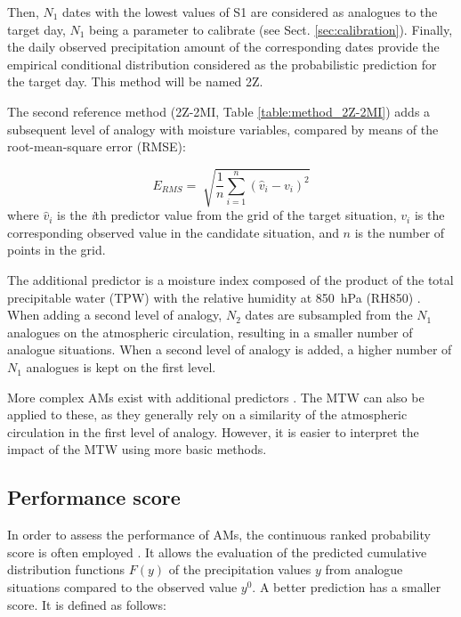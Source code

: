 \documentclass[hess, manuscript]{copernicus}
\begin{document}
	Then, $N_{1}$ dates with the lowest values of S1 are considered as analogues to the target day, $N_{1}$ being a parameter to calibrate (see Sect. \ref{sec:calibration}). Finally, the daily observed precipitation amount of the corresponding dates provide the empirical conditional distribution considered as the probabilistic prediction for the target day. This method will be named 2Z.
	
	The second reference method (2Z-2MI, Table \ref{table:method_2Z-2MI}) adds a subsequent level of analogy with moisture variables, compared by means of the root-mean-square error (RMSE):
	
	\begin{equation}
	\label{eq:RMSE}
	E_{RMS}= \sqrt[]{ \frac{1}{n} \sum_{i=1}^{n}(\hat{v}_{i} - v_{i})^{2}} 
	\end{equation}
	where $\hat{v}_{i}$ is the \textit{i}th predictor value from the grid of the target situation, $v_{i}$ is the corresponding observed value in the candidate situation, and $n$ is the number of points in the grid.
	
	The additional predictor is a moisture index composed of the product of the total precipitable water (TPW) with the relative humidity at 850~hPa (RH850) \citep{Bontron2004}. When adding a second level of analogy, $N_{2}$ dates are subsampled from the $N_{1}$ analogues on the atmospheric circulation, resulting in a smaller number of analogue situations. When a second level of analogy is added, a higher number of $N_{1}$ analogues is kept on the first level.
	
	More complex AMs exist with additional predictors \citep[see e.g.][]{Horton2012a, BenDaoud2016, Caillouet2016}. The MTW can also be applied to these, as they generally rely on a similarity of the atmospheric circulation in the first level of analogy. However, it is easier to interpret the impact of the MTW using more basic methods.
	
	
	\subsection{Performance score}
	\label{sec:performance}
	
	In order to assess the performance of AMs, the continuous ranked probability score \citep[CRPS,][]{Brown1974, Matheson1976, Hersbach2000} is often employed \citep[see, e.g.,][]{Bontron2004, Bontron2005, BenDaoud2008, Horton2012, Marty2012, Radanovics2013, Chardon2014, Junk2015, BenDaoud2016, Caillouet2016}. It allows the evaluation of the predicted cumulative distribution functions $F(y)$ of the precipitation values $y$ from analogue situations compared to the observed value $y^{0}$. A better prediction has a smaller score. It is defined as follows:
	
\end{document}
